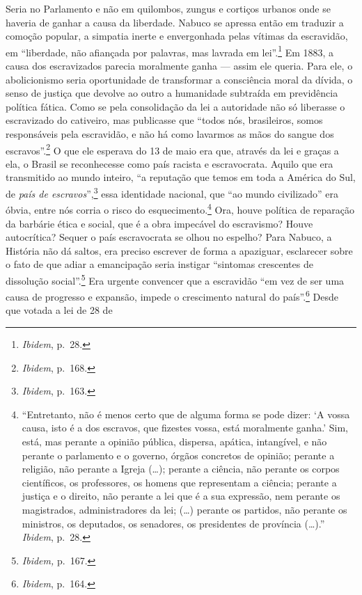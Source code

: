 Seria no Parlamento e não em quilombos, zungus e cortiços urbanos onde
se haveria de ganhar a causa da liberdade. Nabuco se apressa então em
traduzir a comoção popular, a simpatia inerte e envergonhada pelas
vítimas da escravidão, em ``liberdade, não afiançada por palavras, mas
lavrada em lei''.\footnote{\textit{Ibidem}, p.~28.} Em 1883, a causa dos
escravizados parecia moralmente ganha --- assim ele queria. Para ele, o
abolicionismo seria oportunidade de transformar a consciência moral da
dívida, o senso de justiça que devolve ao outro a humanidade subtraída
em previdência política fática. Como se pela consolidação da lei a
autoridade não só liberasse o escravizado do cativeiro, mas publicasse
que ``todos nós, brasileiros, somos responsáveis pela escravidão, e não
há como lavarmos as mãos do sangue dos escravos''.\footnote{\textit{Ibidem},
  p.~168.} O que ele esperava do 13 de maio era que, através da lei e
graças a ela, o Brasil se reconhecesse como país racista e escravocrata.
Aquilo que era transmitido ao mundo inteiro, ``a reputação que temos em
toda a América do Sul, de \textit{país de escravos}'',\footnote{\textit{Ibidem},
  p.~163.} essa identidade nacional, que ``ao mundo civilizado'' era
óbvia, entre nós corria o risco do esquecimento.\footnote{``Entretanto,
  não é menos certo que de alguma forma se pode dizer: `A vossa causa,
  isto é a dos escravos, que fizestes vossa, está moralmente ganha.'
  Sim, está, mas perante a opinião pública, dispersa, apática,
  intangível, e não perante o parlamento e o governo, órgãos concretos
  de opinião; perante a religião, não perante a Igreja (\dots{}); perante a
  ciência, não perante os corpos científicos, os professores, os homens
  que representam a ciência; perante a justiça e o direito, não perante
  a lei que é a sua expressão, nem perante os magistrados,
  administradores da lei; (\ldots{}) perante os partidos, não perante os
  ministros, os deputados, os senadores, os presidentes de província
  (\dots{}).'' \textit{Ibidem}, p.~28.} Ora, houve política de reparação da
barbárie ética e social, que é a obra impecável do escravismo? Houve
autocrítica? Sequer o país escravocrata se olhou no espelho? Para
Nabuco, a História não dá saltos, era preciso escrever de forma a
apaziguar, esclarecer sobre o fato de que adiar a emancipação seria
instigar ``sintomas crescentes de dissolução social''.\footnote{\textit{Ibidem,}
  p.~167.} Era urgente convencer que a escravidão ``em vez de ser uma
causa de progresso e expansão, impede o crescimento natural do
país''.\footnote{\textit{Ibidem}, p.~164.} Desde que votada a lei de 28 de
